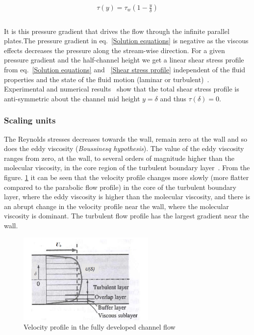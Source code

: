 \begin{equation}
\label{Shear stress profile}
\begin{split}
\tau\left(y\right) = \tau_w \left(1 - \frac{y}{\delta}\right)\\
\end{split}
\end{equation}\\ 
%
It is this pressure gradient that drives the flow through the infinite parallel plates.The pressure gradient in eq.~\ref{Solution equations} is negative as the viscous effects decreases the pressure along the stream-wise direction.  For a given pressure gradient and the half-channel height we get a linear shear stress profile from eq.~\ref{Solution equations} and ~\ref{Shear stress profile} independent of the fluid properties and the state of the fluid motion (laminar or turbulent)~\cite{pope:book}.
Experimental and numerical results~\cite{kim:moin:moser:87} show that the total shear stress profile is anti-symmetric about the channel mid height $ y=\delta $ and thus $\tau\left(\delta\right) = 0$.
%
\subsubsection{Scaling units} \label{scaling}
The Reynolds stresses decreases towards the wall, remain zero at the wall and so does the eddy viscosity (\emph{Boussinesq hypothesis}). The value of the eddy viscosity ranges from zero, at the wall, to several orders of magnitude higher than the molecular viscosity, in the core region of the turbulent boundary layer~\cite{cengel:book}. From the figure. \ref{TFlow} it can be seen that the velocity profile changes more slowly (more flatter compared to the parabolic flow profile) in the core of the turbulent boundary layer, where the eddy viscosity is higher than the molecular viscosity, and there is an abrupt change in the velocity profile near the wall, where the molecular viscosity is dominant. The turbulent flow profile has the largest gradient near the wall. 
\begin{figure}[h]
    \centering
    \includegraphics[width=0.6\textwidth]{figur/Turbulent_profile.png}
    \caption{Velocity profile in the fully developed channel flow ~\cite{cengel:book}}
    \label{TFlow}
\end{figure}

